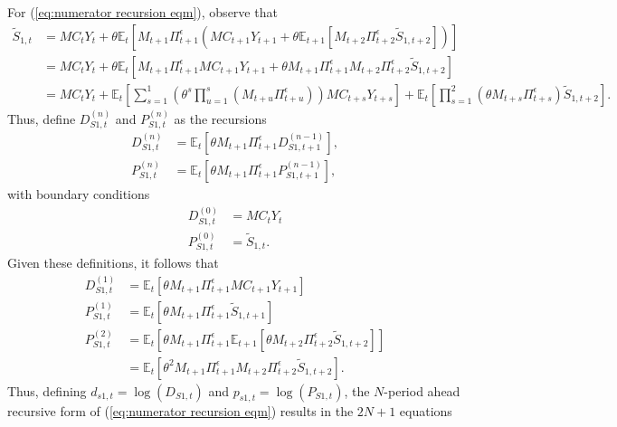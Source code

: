 \documentclass[12 pt, oneside]{article}
\theoremstyle{definition}
\theoremstyle{definition}
\theoremstyle{definition}
\newcommand{\E}{\mathbb{E}}
\begin{document}
For (\ref{eq:numerator recursion eqm}), observe that
\begin{align*}
  \tilde{S}_{1, t} & = MC_t Y_t + \theta\E_t[M_{t + 1}\Pi_{t + 1}^\epsilon (MC_{t + 1}Y_{t + 1} + \theta \E_{t + 1}[M_{ t + 2}\Pi_{t + 2}^\epsilon \tilde{S}_{1, t + 2}])]\\
                   & = MC_t Y_t + \theta\E_t[M_{t + 1}\Pi_{t + 1}^\epsilon MC_{t + 1}Y_{t + 1} + \theta M_{t + 1}\Pi_{t + 1}^\epsilon M_{ t + 2}\Pi_{t + 2}^\epsilon \tilde{S}_{1, t + 2}]\\
                   & =  MC_tY_t+ \E_t\left[\sum_{s = 1}^1 (\theta^s \prod_{u = 1}^s (M_{t + u}\Pi_{t + u}^\epsilon)) MC_{t + s}Y_{t + s}\right] + \E_t\left[\prod_{s = 1}^2(\theta M_{t + s} \Pi_{t + s}^\epsilon) \tilde{S}_{1, t + 2}\right].
\end{align*}
Thus, define $D_{S1, t}^{(n)}$ and $P_{S1, t}^{(n)}$ as the recursions
\begin{align*}
  D_{S1, t}^{(n)} & = \E_t[\theta M_{t + 1} \Pi_{t + 1}^\epsilon D_{S1, t + 1}^{(n - 1)}],\\
  P_{S1, t}^{(n)} & = \E_t[\theta M_{t + 1} \Pi_{t + 1}^\epsilon P_{S1, t + 1}^{(n - 1)}],
\end{align*}
with boundary conditions
\begin{align*}
  D_{S1, t}^{(0)} & = MC_t Y_t\\
  P_{S1, t}^{(0)} & = \tilde{S}_{1, t}.
\end{align*}
Given these definitions, it follows that
\begin{align*}
  D_{S1, t}^{(1)} & = \E_t[\theta M_{t + 1} \Pi_{t + 1}^\epsilon MC_{t + 1}Y_{t + 1}]\\
  P_{S1, t}^{(1)} & = \E_t[\theta M_{t + 1}\Pi_{t + 1}^\epsilon \tilde{S}_{1, t + 1}]\\
  P_{S1, t}^{(2)} & = \E_t[\theta M_{t + 1}\Pi_{t + 1}^\epsilon\E_{t + 1}[\theta M_{t + 2}\Pi_{t + 2}^\epsilon \tilde{S}_{1, t + 2}]]\\
                  & = \E_t[\theta^2 M_{t + 1}\Pi_{t + 1}^\epsilon M_{t + 2}\Pi_{t + 2}^\epsilon \tilde{S}_{1, t + 2}].
\end{align*}
Thus, defining $d_{s1, t} = \log(D_{S1, t})$ and $p_{s1, t} = \log(P_{S1, t})$,
the $N$-period ahead recursive form of (\ref{eq:numerator recursion eqm}) results in the $2N + 1$ equations
\end{document}
